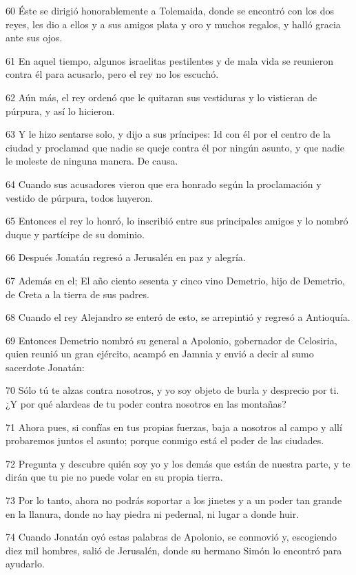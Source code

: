 \par 60 Éste se dirigió honorablemente a Tolemaida, donde se encontró con los dos reyes, les dio a ellos y a sus amigos plata y oro y muchos regalos, y halló gracia ante sus ojos.
\par 61 En aquel tiempo, algunos israelitas pestilentes y de mala vida se reunieron contra él para acusarlo, pero el rey no los escuchó.
\par 62 Aún más, el rey ordenó que le quitaran sus vestiduras y lo vistieran de púrpura, y así lo hicieron.
\par 63 Y le hizo sentarse solo, y dijo a sus príncipes: Id con él por el centro de la ciudad y proclamad que nadie se queje contra él por ningún asunto, y que nadie le moleste de ninguna manera. De causa.
\par 64 Cuando sus acusadores vieron que era honrado según la proclamación y vestido de púrpura, todos huyeron.
\par 65 Entonces el rey lo honró, lo inscribió entre sus principales amigos y lo nombró duque y partícipe de su dominio.
\par 66 Después Jonatán regresó a Jerusalén en paz y alegría.
\par 67 Además en el; El año ciento sesenta y cinco vino Demetrio, hijo de Demetrio, de Creta a la tierra de sus padres.
\par 68 Cuando el rey Alejandro se enteró de esto, se arrepintió y regresó a Antioquía.
\par 69 Entonces Demetrio nombró su general a Apolonio, gobernador de Celosiria, quien reunió un gran ejército, acampó en Jamnia y envió a decir al sumo sacerdote Jonatán:
\par 70 Sólo tú te alzas contra nosotros, y yo soy objeto de burla y desprecio por ti. ¿Y por qué alardeas de tu poder contra nosotros en las montañas?
\par 71 Ahora pues, si confías en tus propias fuerzas, baja a nosotros al campo y allí probaremos juntos el asunto; porque conmigo está el poder de las ciudades.
\par 72 Pregunta y descubre quién soy yo y los demás que están de nuestra parte, y te dirán que tu pie no puede volar en su propia tierra.
\par 73 Por lo tanto, ahora no podrás soportar a los jinetes y a un poder tan grande en la llanura, donde no hay piedra ni pedernal, ni lugar a donde huir.
\par 74 Cuando Jonatán oyó estas palabras de Apolonio, se conmovió y, escogiendo diez mil hombres, salió de Jerusalén, donde su hermano Simón lo encontró para ayudarlo.
